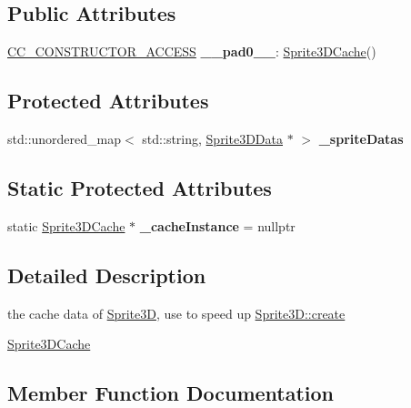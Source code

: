 \subsection*{Public Attributes}
\begin{DoxyCompactItemize}
\item 
\mbox{\label{classSprite3DCache_a1cbd2ca5173a07bf2d58dc39e68a5f2b}} 
\hyperlink{_2cocos2d_2cocos_2base_2ccConfig_8h_a25ef1314f97c35a2ed3d029b0ead6da0}{C\+C\+\_\+\+C\+O\+N\+S\+T\+R\+U\+C\+T\+O\+R\+\_\+\+A\+C\+C\+E\+SS} {\bfseries \+\_\+\+\_\+pad0\+\_\+\+\_\+}\+: \hyperlink{classSprite3DCache}{Sprite3\+D\+Cache}()
\end{DoxyCompactItemize}
\subsection*{Protected Attributes}
\begin{DoxyCompactItemize}
\item 
\mbox{\label{classSprite3DCache_a71b89ba4f495a2826f7865564635eacf}} 
std\+::unordered\+\_\+map$<$ std\+::string, \hyperlink{structSprite3DCache_1_1Sprite3DData}{Sprite3\+D\+Data} $\ast$ $>$ {\bfseries \+\_\+sprite\+Datas}
\end{DoxyCompactItemize}
\subsection*{Static Protected Attributes}
\begin{DoxyCompactItemize}
\item 
\mbox{\label{classSprite3DCache_a03b27914787435be3b1b619555c05362}} 
static \hyperlink{classSprite3DCache}{Sprite3\+D\+Cache} $\ast$ {\bfseries \+\_\+cache\+Instance} = nullptr
\end{DoxyCompactItemize}


\subsection{Detailed Description}
the cache data of \hyperlink{classSprite3D}{Sprite3D}, use to speed up \hyperlink{classSprite3D_a10905e0480bfcf875882a9ad7b538d78}{Sprite3\+D\+::create} 

\hyperlink{classSprite3DCache}{Sprite3\+D\+Cache} 

\subsection{Member Function Documentation}
\mbox{\label{classSprite3DCache_a8347de6c622a257f92a286f21a1774bf}} 
